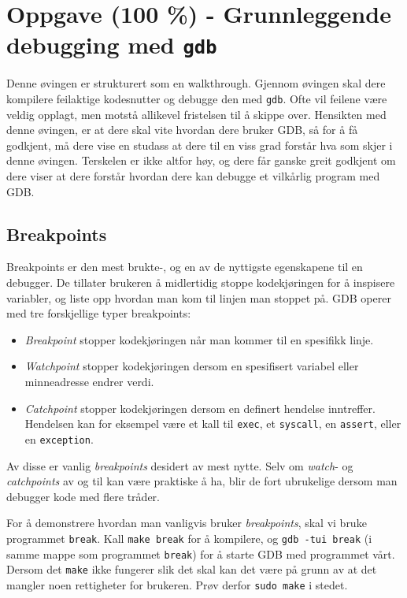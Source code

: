 \section{Oppgave (100 \%) - Grunnleggende debugging med \texttt{gdb}}\label{sec:3-oppgave}

Denne øvingen er strukturert som en walkthrough. Gjennom øvingen skal dere kompilere feilaktige kodesnutter og debugge den med \verb|gdb|. Ofte vil feilene være veldig opplagt, men motstå allikevel fristelsen til å skippe over. Hensikten med denne øvingen, er at dere skal vite hvordan dere bruker GDB, så for å få godkjent, må dere vise en studass at dere til en viss grad forstår hva som skjer i denne øvingen. Terskelen er ikke altfor høy, og dere får ganske greit godkjent om dere viser at dere forstår hvordan dere kan debugge et vilkårlig program med GDB.

\subsection{Breakpoints}

Breakpoints er den mest brukte-, og en av de nyttigste egenskapene til en debugger. De tillater brukeren å midlertidig stoppe kodekjøringen for å inspisere variabler, og liste opp hvordan man kom til linjen man stoppet på. GDB operer med tre forskjellige typer breakpoints:

\begin{itemize}
    \item \textit{Breakpoint} stopper kodekjøringen når man kommer til en spesifikk linje.
    \item \textit{Watchpoint} stopper kodekjøringen dersom en spesifisert variabel eller minneadresse endrer verdi.
    \item \textit{Catchpoint} stopper kodekjøringen dersom en definert hendelse inntreffer. Hendelsen kan for eksempel være et kall til \verb|exec|, et \verb|syscall|, en \verb|assert|, eller en \verb|exception|.
\end{itemize}

Av disse er vanlig \textit{breakpoints} desidert av mest nytte. Selv om \textit{watch}- og \textit{catchpoints} av og til kan være praktiske å ha, blir de fort ubrukelige dersom man debugger kode med flere tråder.

For å demonstrere hvordan man vanligvis bruker \textit{breakpoints}, skal vi bruke programmet \verb|break|. Kall \verb|make break| for å kompilere, og \verb|gdb -tui break| (i samme mappe som programmet \verb|break|) for å starte GDB med programmet vårt. Dersom det \verb|make| ikke fungerer slik det skal kan det være på grunn av at det mangler noen rettigheter for brukeren. Prøv derfor \verb|sudo make| i stedet.

